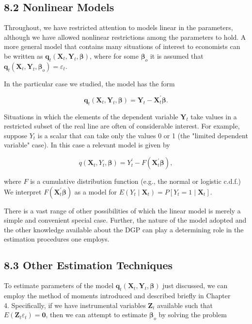 \documentclass[10pt]{article}
\begin{document}
\subsection*{8.2 Nonlinear Models}
Throughout, we have restricted attention to models linear in the parameters, although we have allowed nonlinear restrictions among the parameters to hold. A more general model that contains many situations of interest to economists can be written as $\mathbf{q}_{t}\left(\mathbf{X}_{t}, \mathbf{Y}_{t}, \boldsymbol{\beta}\right)$, where for some $\boldsymbol{\beta}_{o}$ it is assumed that $\mathbf{q}_{t}\left(\mathbf{X}_{t}, \mathbf{Y}_{t}, \boldsymbol{\beta}_{o}\right)=\varepsilon_{t}$.

In the particular case we studied, the model has the form

$$
\mathbf{q}_{t}\left(\mathbf{X}_{t}, \mathbf{Y}_{t}, \boldsymbol{\beta}\right)=\mathbf{Y}_{t}-\mathbf{X}_{t}^{\prime} \boldsymbol{\beta} .
$$

Situations in which the elements of the dependent variable $\mathbf{Y}_{t}$ take values in a restricted subset of the real line are often of considerable interest. For example, suppose $Y_{t}$ is a scalar that can take only the values 0 or 1 (the "limited dependent variable" case). In this case a relevant model is given by

$$
q\left(\mathbf{X}_{t}, Y_{t}, \boldsymbol{\beta}\right)=Y_{t}^{\prime}-F\left(\mathbf{X}_{t}^{\prime} \boldsymbol{\beta}\right),
$$

where $F$ is a cumulative distribution function (e.g., the normal or logistic c.d.f.) We interpret $F\left(\mathbf{X}_{t}^{\prime} \boldsymbol{\beta}\right)$ as a model for $E\left(Y_{t} \mid \mathbf{X}_{t}\right)=P\left[Y_{t}=1 \mid \mathbf{X}_{t}\right]$.

There is a vast range of other possibilities of which the linear model is merely a simple and convenient special case. Further, the nature of the model adopted and the other knowledge available about the DGP can play a determining role in the estimation procedures one employs.

\subsection*{8.3 Other Estimation Techniques}
To estimate parameters of the model $\mathbf{q}_{t}\left(\mathbf{X}_{t}, \mathbf{Y}_{t}, \boldsymbol{\beta}\right)$ just discussed, we can employ the method of moments introduced and described briefly in Chapter\\
4. Specifically, if we have instrumental variables $\mathbf{Z}_{t}$ available such that $E\left(\mathbf{Z}_{t} \varepsilon_{t}\right)=\mathbf{0}$, then we can attempt to estimate $\boldsymbol{\beta}_{o}$ by solving the problem
\end{document}
